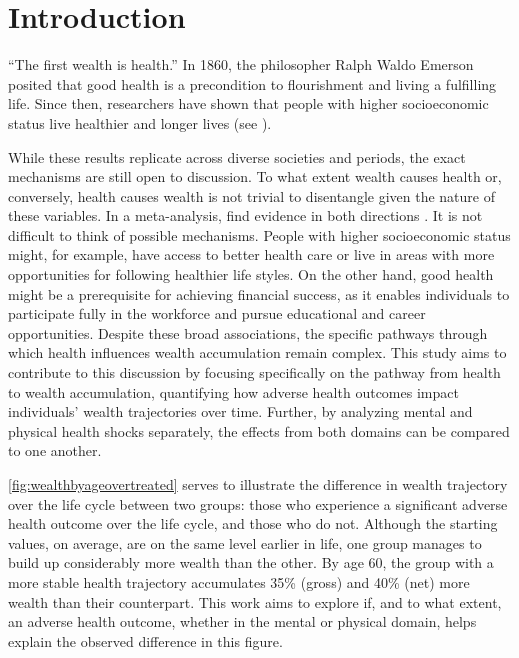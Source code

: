 

%

\chapter{Introduction}

\vspace{60pt}

``The first wealth is health.'' \quad In 1860, the philosopher Ralph Waldo Emerson posited that good health is
a precondition to flourishment and living a fulfilling life.  Since then, researchers have shown that people with higher socioeconomic status live healthier and longer lives (see \cite{deaton2003health,case.deaton2005broken,chetty.etal2016association}). %
%

While these results replicate across diverse societies and periods, the exact mechanisms are still open to
discussion. To what extent wealth causes health or, conversely, health causes wealth is not trivial to disentangle
given the nature of these variables. In a meta-analysis, \citeauthor{kröger.etal2015what} find evidence in both
directions \autocite{kröger.etal2015what}. It is not difficult to think of possible mechanisms. People with higher
socioeconomic status might, for example, have access to better health care or live in areas with more opportunities for following healthier life styles. On the other hand, good health might be a prerequisite for achieving
financial success, as it enables individuals to participate fully in the workforce and pursue educational and career
opportunities. Despite these broad associations, the specific pathways through which health influences wealth
accumulation remain complex. This study aims to contribute to this discussion by focusing specifically on the
pathway from health to wealth accumulation, quantifying how adverse health outcomes impact individuals' wealth
trajectories over time. Further, by analyzing mental and physical health shocks separately, the effects from
both domains can be compared to one another. 


\cref{fig:wealthbyageovertreated} serves to illustrate the difference in wealth trajectory over the life cycle
between two groups: those who experience a significant adverse health outcome over the life cycle, and those who do
not. Although the starting values, on average, are on the same level earlier in life, one group manages to build up
considerably more wealth than the other. By age 60, the group with a more stable health
trajectory accumulates 35\% (gross) and 40\% (net) more wealth than their counterpart.
This work aims to explore if, and to what extent, an adverse health outcome, whether in the mental or physical
domain, helps explain the observed difference in this figure.


